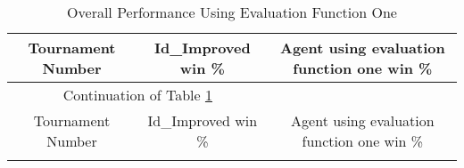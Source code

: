\documentclass[11pt]{article}
\begin{document}
\begin{longtable}[c]{| c | c |c |}
 \caption{Overall Performance Using Evaluation Function One\label{eval_fun1_overall}}\\
 \hline
 \hline
 Tournament Number & Id\_Improved win \% & Agent using evaluation function one win \% \\
 \hline
 \endfirsthead
 
 \hline
 \multicolumn{2}{|c|}{Continuation of Table \ref{eval_fun1_overall}}\\ 
 \hline
 Tournament Number & Id\_Improved win \% & Agent using evaluation function one win \% \\
 \hline
 \endhead
 
 \hline
 \endfoot
 

\end{longtable}
\end{document}
